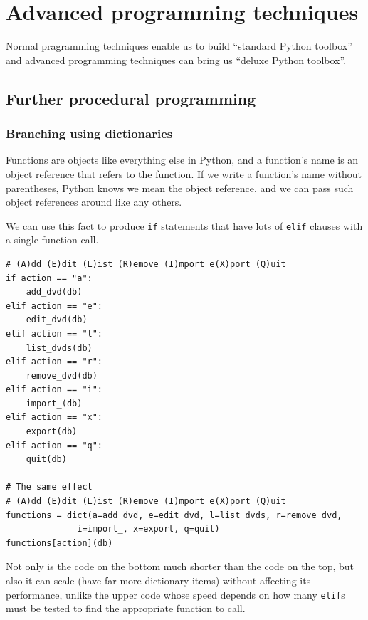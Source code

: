 
\chapter{Advanced programming techniques}

\begin{tcolorbox}
  Normal pragramming techniques enable us to build ``standard Python toolbox'' and
  advanced programming techniques can bring us ``deluxe Python toolbox''.
\end{tcolorbox}

\section{Further procedural programming}

\subsection{Branching using dictionaries}


\begin{tcolorbox}
  Functions are objects like everything else in Python, and
  a function's name is an object reference that refers to the function.
  If we write a function's name without parentheses,
  Python knows we mean the object reference, and
  we can pass such object references around like any others.
\end{tcolorbox}

We can use this fact to produce \verb|if| statements that have lots of \verb|elif| clauses with a single function call.


\begin{lstlisting}
# (A)dd (E)dit (L)ist (R)emove (I)mport e(X)port (Q)uit
if action == "a":
    add_dvd(db)
elif action == "e":
    edit_dvd(db)
elif action == "l":
    list_dvds(db)
elif action == "r":
    remove_dvd(db)
elif action == "i":
    import_(db)
elif action == "x":
    export(db)
elif action == "q":
    quit(db)

# The same effect
# (A)dd (E)dit (L)ist (R)emove (I)mport e(X)port (Q)uit
functions = dict(a=add_dvd, e=edit_dvd, l=list_dvds, r=remove_dvd,
              i=import_, x=export, q=quit)
functions[action](db)  
\end{lstlisting}

Not only is the code on the bottom much shorter than the code on the top,
but also it can scale (have far more dictionary items) without affecting its performance,
unlike the upper code whose speed depends on how many \verb|elif|s must be tested to find the appropriate function to call.


